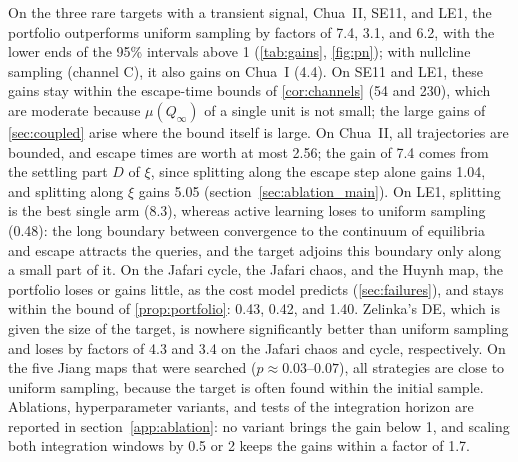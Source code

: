 On the three rare targets with a transient signal, Chua~II, SE11, and LE1, the portfolio outperforms uniform sampling by factors of 7.4, 3.1, and 6.2, with the lower ends of the 95\% intervals above 1 (\cref{tab:gains}, \cref{fig:pn}); with nullcline sampling (channel C), it also gains on Chua~I (4.4). On SE11 and LE1, these gains stay within the escape-time bounds of \cref{cor:channels} (54 and 230), which are moderate because $\mu(Q_\infty)$ of a single unit is not small; the large gains of \cref{sec:coupled} arise where the bound itself is large. On Chua~II, all trajectories are bounded, and escape times are worth at most 2.56; the gain of 7.4 comes from the settling part $D$ of $\xi$, since splitting along the escape step alone gains 1.04, and splitting along $\xi$ gains 5.05 (section~\ref{sec:ablation_main}). On LE1, splitting is the best single arm (8.3), whereas active learning loses to uniform sampling (0.48): the long boundary between convergence to the continuum of equilibria and escape attracts the queries, and the target adjoins this boundary only along a small part of it. On the Jafari cycle, the Jafari chaos, and the Huynh map, the portfolio loses or gains little, as the cost model predicts (\cref{sec:failures}), and stays within the bound of \cref{prop:portfolio}: 0.43, 0.42, and 1.40. Zelinka's DE, which is given the size of the target, is nowhere significantly better than uniform sampling and loses by factors of 4.3 and 3.4 on the Jafari chaos and cycle, respectively. On the five Jiang maps that were searched ($p\approx0.03$--$0.07$), all strategies are close to uniform sampling, because the target is often found within the initial sample. Ablations, hyperparameter variants, and tests of the integration horizon are reported in section~\ref{app:ablation}: no variant brings the gain below 1, and scaling both integration windows by 0.5 or 2 keeps the gains within a factor of 1.7.

